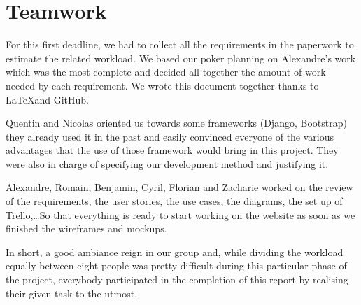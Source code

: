 \section{Teamwork}

For this first deadline, we had to collect all the requirements in the
paperwork to estimate the related workload. We based our poker planning
on Alexandre's work which was the most complete and decided all together the
amount of work needed by each requirement. We wrote this document
together thanks to \LaTeX  and GitHub.\newline

Quentin and Nicolas oriented us towards some frameworks (Django,
Bootstrap) they already used it in the past and easily convinced everyone of the various advantages that the use of those framework would bring in this project. They were also in charge of specifying our development method and justifying it.

Alexandre, Romain, Benjamin, Cyril, Florian and Zacharie worked on the
review of the requirements, the user stories, the use cases, the
diagrams, the set up of Trello,\ldots So that everything is ready to start
working on the website as soon as we finished the wireframes and
mockups. \newline

In short, a good ambiance reign in our group and, while dividing the workload equally between eight people was pretty difficult during this particular phase of the project, everybody participated in the completion of this report by realising their given task to the utmost.
